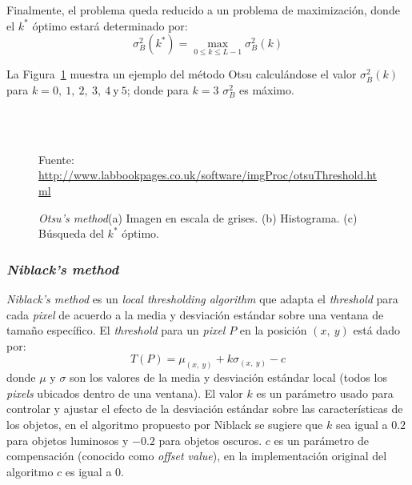 Finalmente, el problema queda reducido a un problema de maximización, donde el
$k^*$ óptimo estará determinado por:
\begin{equation}
  \sigma_B^2(k^*) = \max_{0 \leq k \leq L - 1} \sigma_B^2 (k)
\end{equation}

La Figura~\ref{Fig:Cap-marcoteorico:otsu} muestra un ejemplo del método Otsu 
calculándose el valor $\sigma_B^2(k)$ para
$k = 0,~ 1,~ 2,~ 3,~ 4~ \text{y}~5$; donde para $k=3$ $\sigma_B^2$ es máximo.

\begin{figure}[h!]
	\centering
   { }
   \\
   \\
	\caption[\textit{Otsu's method}]{\textit{Otsu's method}(a) Imagen en escala 
	de grises. (b) Histograma. (c) Búsqueda del $k^*$ óptimo.} \tiny{Fuente:
	\url{http://www.labbookpages.co.uk/software/imgProc/otsuThreshold.html}}
	\label{Fig:Cap-marcoteorico:otsu}
\end{figure}

\subsubsection{\textit{Niblack's method}}
	\textit{Niblack's method}\cite{Niblack:1985:IDI} es un \textit{local 
	thresholding algorithm} que adapta el \textit{threshold} para cada
	\textit{pixel} de acuerdo a la media y desviación estándar sobre una 
	ventana de tamaño específico. 
	El \textit{threshold} para un \textit{pixel} $P$ en la posición $(x, ~y)$ 
	está dado por:
	\begin{equation}
		T(P) = \mu_{(x,~y)} + k \sigma_{(x, ~y)} - c
	\end{equation}
	donde $\mu$ y $\sigma$ son los valores de la media y desviación estándar 
	local (todos los \textit{pixels} ubicados dentro de una ventana). El valor 
	$k$ es un parámetro usado para controlar y ajustar el efecto de la 
	desviación estándar sobre las características de los objetos, en el 
	algoritmo propuesto por Niblack se sugiere que $k$ sea igual a $0.2$ para
	objetos luminosos y $-0.2$ para objetos oscuros. $c$ es un parámetro de 
	compensación (conocido como \textit{offset value}), en la implementación 
	original del algoritmo $c$ es igual a $0$. 
	
